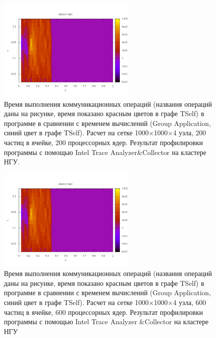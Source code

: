 	   
\begin{figure}[h]
	\begin{center}
		\includegraphics[height=5cm,keepaspectratio]{images/scalingNSU-img10.png}
		\caption{
			Время выполнения коммуникационных операций (названия операций даны на рисунке, время показано красным цветов в графе TSelf) в программе в сравнении с временем вычислений (Group Application, синий цвет в графе TSelf). Расчет на сетке 1000×1000×4 узла, 200 частиц в ячейке, 200 процессорных ядер. Результат профилировки программы с помощью Intel Trace Analyzer&Collector на кластере НГУ.
		}
		\label{scale9}
	\end{center} 
\end{figure}	    
	    
	    
	   

\begin{figure}[h]
	\begin{center}
		\includegraphics[height=5cm,keepaspectratio]{images/scalingNSU-img10.png}
		\caption{
		Время выполнения коммуникационных операций (названия операций даны на рисунке, время показано красным цветов в графе TSelf) в программе в сравнении с временем вычислений (Group Application, синий цвет в графе TSelf). Расчет на сетке 1000×1000×4 узла, 600 частиц в ячейке, 600 процессорных ядер. Результат профилировки программы с помощью Intel Trace Analyzer \&Collector на кластере НГУ
		}
		\label{scale10}
	\end{center} 
\end{figure}
	 
